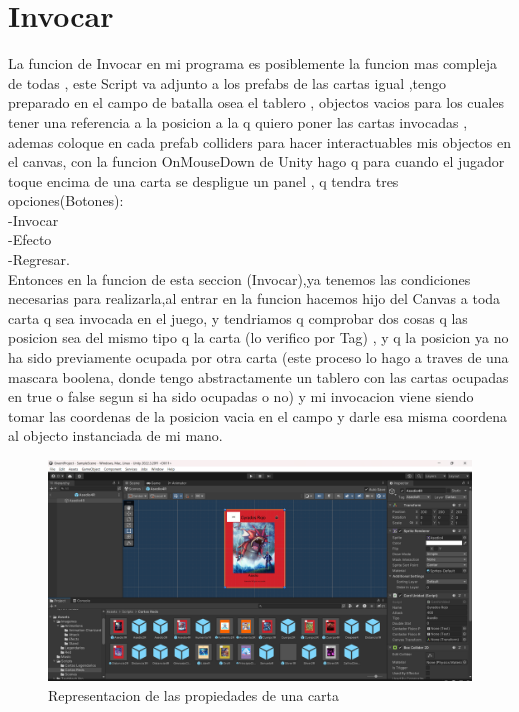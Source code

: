\documentclass{article}
\begin{document}
\section{Invocar}
La funcion de Invocar en mi programa es posiblemente la funcion mas compleja de todas , este Script va adjunto a los prefabs de las cartas igual ,tengo preparado en el campo de batalla osea el tablero , objectos vacios para los cuales tener una referencia a la posicion a la q quiero poner las cartas invocadas , ademas coloque en cada prefab colliders para hacer interactuables mis objectos en el canvas, con la funcion OnMouseDown de Unity hago q para cuando el jugador toque encima de una carta se despligue un panel , q tendra tres opciones(Botones):\\
-Invocar\\
-Efecto\\
-Regresar.\\
Entonces en la funcion de esta seccion (Invocar),ya tenemos las condiciones necesarias para realizarla,al entrar en la funcion hacemos hijo del Canvas a toda carta q sea invocada en el juego, y tendriamos q comprobar dos cosas q las posicion sea del mismo tipo q la carta (lo verifico por Tag) , y q la posicion ya no ha sido previamente ocupada por otra carta (este proceso lo hago a traves de una mascara boolena, donde tengo abstractamente un tablero con las cartas ocupadas en true o false segun si ha sido ocupadas o no) y mi invocacion viene siendo tomar las coordenas de la posicion vacia en el campo y darle esa misma coordena al objecto instanciada de mi mano.
\begin{figure}
\centering
\includegraphics[width =1\textwidth]
{4}
\caption{Representacion de las propiedades de una carta}
\label{fig : a}
\end{figure}
\newpage
\end{document}
